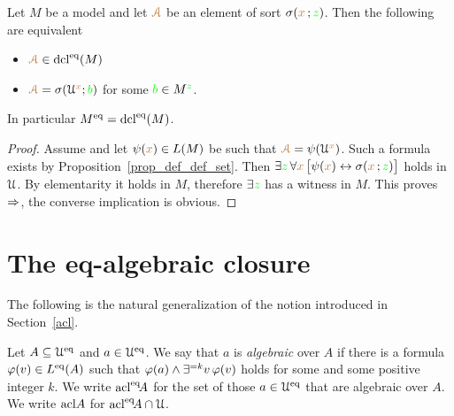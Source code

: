 \begin{proposition}\label{prop_standard_def_set}
Let $M$ be a model and let ${\color{brown}\EuScript A}$ be an element of sort $\sigma({\color{brown} x}\,;{\color{green} z})$.
Then the following are equivalent
\begin{itemize}
\item[1.]  ${\color{brown}\EuScript A}\in{\rm dcl}^{{\rm eq}}(M)$
\item[2.]  ${\color{brown}\EuScript A}=\sigma(\EuScript U^{\color{brown} x};{\color{green} b})$ for some ${\color{green} b}\in M^{\color{green} z}$.
\end{itemize}
\smallskip
In particular $M^{{\rm eq}}={\rm dcl}^{{\rm eq}}(M)$.
\end{proposition}

\begin{proof}
Assume  and let $\psi({\color{brown} x})\in L(M)$ be such that ${\color{brown}\EuScript A}=\psi(\EuScript U^{\color{brown} x})$.
Such a formula exists by Proposition~\ref{prop_def_def_set}.
Then $\exists{\color{green}z}\,\forall{\color{brown}x}\,\big[\psi({\color{brown} x})\leftrightarrow\sigma({\color{brown} x}\,;{\color{green} z})\big]$ holds in $\EuScript U$.
By elementarity it holds in $M$, therefore $\exists{\color{green}z}$ has a witness in $M$.
This proves $\Rightarrow$, the converse implication is obvious.
\end{proof}

\section{The eq-algebraic closure}\label{eq_algebraic}

The following is the natural generalization of the notion introduced in Section~\ref{acl}.

\begin{definition}
  Let $A\subseteq\EuScript U^{{\rm eq}}$ and $a\in\EuScript U^{{\rm eq}}$.
  We say that $a$ is \emph{algebraic\/}  over $A$ if there is a formula $\varphi(v)\in L^{{\rm eq}}(A)$ such that $\varphi(a)\wedge\exists^{=k}v\,\varphi(v)$ holds for some and some positive integer $k$.
  We write \emph{${\rm acl}^{{\rm eq}}\!A$\/} for the set of those $a\in\EuScript U^{{\rm eq}}$ that are algebraic over $A$.
  We write \emph{${\rm acl}A$\/} for ${\rm acl}^{{\rm eq}}\!A\cap\EuScript U$.
\end{definition}


